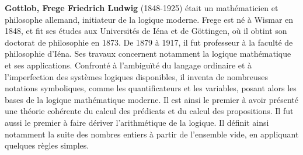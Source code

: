 \textbf{Gottlob, Frege Friedrich Ludwig} (1848-1925) était un mathématicien et philosophe allemand, initiateur de la logique moderne. Frege est né à Wismar en 1848, et fit ses études aux Universités de Iéna et de Göttingen, où il obtint son doctorat de philosophie en 1873. De 1879 à 1917, il fut professeur à la faculté de philosophie d'Iéna. Ses travaux concernent notamment la logique mathématique et ses applications. Confronté à l'ambiguïté du langage ordinaire et à l'imperfection des systèmes logiques disponibles, il inventa de nombreuses notations symboliques, comme les quantificateurs et les variables, posant alors les bases de la logique mathématique moderne. Il est ainsi le premier à avoir présenté une théorie cohérente du calcul des prédicats et du calcul des propositions. Il fut aussi le premier à faire dériver l'arithmétique de la logique. Il définit ainsi notamment la suite des nombres entiers à partir de l'ensemble vide, en appliquant quelques règles simples.

